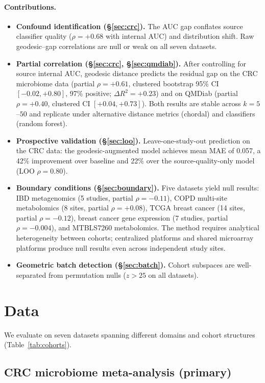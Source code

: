 \documentclass{article}
\begin{document}
\paragraph{Contributions.}
\begin{itemize}
\item \textbf{Confound identification (\S\ref{sec:crc}).} The AUC gap conflates source classifier quality ($\rho = +0.68$ with internal AUC) and distribution shift. Raw geodesic--gap correlations are null or weak on all seven datasets.
\item \textbf{Partial correlation (\S\ref{sec:crc}, \S\ref{sec:qmdiab}).} After controlling for source internal AUC, geodesic distance predicts the residual gap on the CRC microbiome data (partial $\rho = +0.61$, clustered bootstrap 95\% CI $[-0.02, +0.80]$, 97\% positive; $\Delta R^2 = +0.23$) and on QMDiab (partial $\rho = +0.40$, clustered CI $[+0.04, +0.73]$). Both results are stable across $k = 5$--$50$ and replicate under alternative distance metrics (chordal) and classifiers (random forest).
\item \textbf{Prospective validation (\S\ref{sec:loo}).} Leave-one-study-out prediction on the CRC data: the geodesic-augmented model achieves mean MAE of 0.057, a 42\% improvement over baseline and 22\% over the source-quality-only model (LOO $\rho = 0.80$).
\item \textbf{Boundary conditions (\S\ref{sec:boundary}).} Five datasets yield null results: IBD metagenomics (5 studies, partial $\rho = -0.11$), COPD multi-site metabolomics (8 sites, partial $\rho = +0.08$), TCGA breast cancer (14 sites, partial $\rho = -0.12$), breast cancer gene expression (7 studies, partial $\rho = -0.004$), and MTBLS7260 metabolomics. The method requires analytical heterogeneity between cohorts; centralized platforms and shared microarray platforms produce null results even across independent study sites.
\item \textbf{Geometric batch detection (\S\ref{sec:batch}).} Cohort subspaces are well-separated from permutation nulls ($z > 25$ on all datasets).
\end{itemize}


\section{Data}

We evaluate on seven datasets spanning different domains and cohort structures (Table~\ref{tab:cohorts}).

\subsection{CRC microbiome meta-analysis (primary)}
\label{sec:crc_data}
\end{document}
